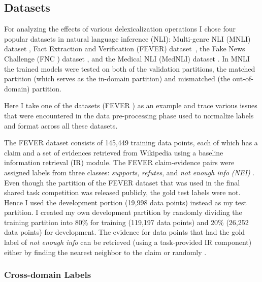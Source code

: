 \documentclass{article}
\begin{document}
\subsection{Datasets}
For analyzing the effects of various delexicalization operations I chose four  popular datasets in natural language inference (NLI): Multi-genre NLI (MNLI) dataset \cite{williams2017broad}, Fact Extraction and Verification  (FEVER) dataset~\cite{thorne2018fever}, the Fake News Challenge (FNC ) dataset \cite{pomerleau2017fake}, and the Medical NLI (MedNLI) dataset \cite{romanov2018lessons}. In MNLI the trained models were tested on both of the validation partitions, the matched partition (which serves as the in-domain partition) and mismatched (the out-of-domain) partition.

Here I take one of the datasets (FEVER \citep*{thorne2018fever}) as an example and trace various issues that were encountered in the data pre-processing phase used to normalize labels and format across all these datasets.


{} The FEVER \citep*{thorne2018fever} dataset consists of 145,449 training data points, each of which has a claim and a set of evidences retrieved from Wikipedia using a baseline information retrieval (IR) module.
The FEVER claim-evidence pairs were assigned labels from three classes: \textit{supports}, \textit{refutes}, and \textit{not enough info (NEI)} . Even though the partition of the FEVER dataset that was used in the final shared task competition was released publicly, the gold test labels were not. Hence I used the development portion (19,998 data points) instead as my test partition. I created my own development partition by randomly dividing the training partition into 80\% for training (119,197 data points) and 20\% (26,252 data points) for development.  The evidence for data points that had the gold label of \textit{not enough info} can be retrieved (using a task-provided IR component) either by finding the nearest neighbor to the claim or randomly \citep*{thorne2018fever}. 


\subsubsection{Cross-domain Labels}
\label{sec:crossdomain}
\end{document}
